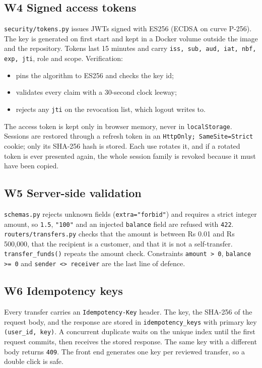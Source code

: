 \documentclass[11pt,a4paper]{article}
\newcommand{\code}[1]{\texttt{#1}}
\begin{document}
\subsection*{W4 Signed access tokens}
\code{security/tokens.py} issues JWTs signed with ES256 (ECDSA on curve P-256). The key is generated on first start and kept in a Docker volume outside the image and the repository. Tokens last 15 minutes and carry \code{iss, sub, aud, iat, nbf, exp, jti}, role and scope. Verification:
\begin{itemize}
\item pins the algorithm to ES256 and checks the key id;
\item validates every claim with a 30-second clock leeway;
\item rejects any \code{jti} on the revocation list, which logout writes to.
\end{itemize}
The access token is kept only in browser memory, never in \code{localStorage}. Sessions are restored through a refresh token in an \code{HttpOnly; SameSite=Strict} cookie; only its SHA-256 hash is stored. Each use rotates it, and if a rotated token is ever presented again, the whole session family is revoked because it must have been copied.

\subsection*{W5 Server-side validation}
\code{schemas.py} rejects unknown fields (\code{extra="forbid"}) and requires a strict integer amount, so \code{1.5}, \code{"100"} and an injected \code{balance} field are refused with \code{422}. \code{routers/transfers.py} checks that the amount is between Rs 0.01 and Rs 500,000, that the recipient is a customer, and that it is not a self-transfer. \code{transfer\_funds()} repeats the amount check. Constraints \code{amount > 0}, \code{balance >= 0} and \code{sender <> receiver} are the last line of defence.

\subsection*{W6 Idempotency keys}
Every transfer carries an \code{Idempotency-Key} header. The key, the SHA-256 of the request body, and the response are stored in \code{idempotency\_keys} with primary key \code{(user\_id, key)}. A concurrent duplicate waits on the unique index until the first request commits, then receives the stored response. The same key with a different body returns \code{409}. The front end generates one key per reviewed transfer, so a double click is safe.
\end{document}

